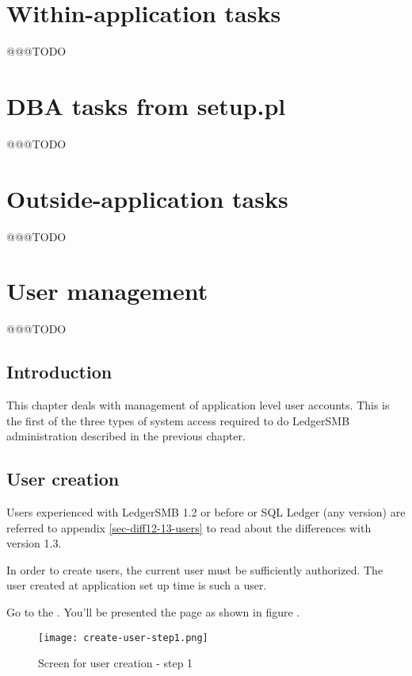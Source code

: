 \chapter{Within-application tasks}
\label{cha-within-app-tasks}

@@@TODO

\chapter{DBA tasks from setup.pl}
\label{cha-dba-tasks}

@@@TODO

\chapter{Outside-application tasks}
\label{cha-outside-app-tasks}

@@@TODO

\chapter{User management}
\label{cha-user-management}

@@@TODO

\section{Introduction}
\label{sec-user-management-introduction}

This chapter deals with management of application level user accounts. This is the first
of the three types of system access required to do LedgerSMB administration described in
the previous chapter.

\section{User creation}
\label{sec-user-creation}

Users experienced with LedgerSMB 1.2 or before or SQL Ledger (any version) are
referred to appendix \ref{sec-diff12-13-users} to read about the differences
with version 1.3.

In order to create users, the current user must be sufficiently authorized. The user
created at application set up time is such a user.

Go to the . You'll be presented the page as shown in figure .

\begin{figure}[h]
\texttt{[image: create-user-step1.png]}
\caption{Screen for user creation - step 1}
\end{figure}
\label{fig:create-user-step1}

